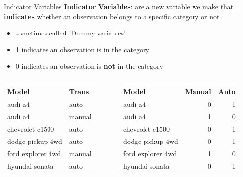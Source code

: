 \documentclass{beamer}
\begin{document}
\begin{frame}{Indicator Variables}
\textbf{Indicator Variables}: are a new variable we make that \textbf{indicates} whether an observation belongs to a specific category or not
\begin{itemize}
    \item sometimes called 'Dummy variables'
    \item 1 indicates an observation is in the category
    \item 0 indicates an observation is \textbf{not} in the category
\end{itemize}
\small
\begin{columns}
\begin{column}{0.45\textwidth}
\vspace{3mm}
\begin{table}[ht]
\centering
\begin{tabular}{ll}
  \hline
Model & Trans \\ 
  \hline
audi a4 & auto \\ 
  audi a4 & manual \\ 
  chevrolet c1500 & auto \\ 
  dodge pickup 4wd & auto \\ 
  ford explorer 4wd & manual \\ 
  hyundai sonata & auto \\ 
   \hline
\end{tabular}
\end{table}
\end{column}
\begin{column}{0.45\textwidth}  %
\begin{table}[ht]
\centering
\begin{tabular}{lrr}
  \hline
Model & Manual & Auto \\ 
  \hline
audi a4 & 0 & 1 \\ 
  audi a4 & 1 & 0 \\ 
  chevrolet c1500  & 0 & 1 \\ 
  dodge pickup 4wd & 0 & 1 \\ 
  ford explorer 4wd & 1 & 0 \\ 
  hyundai sonata & 0 & 1 \\ 
   \hline
\end{tabular}
\end{table}
\end{column}
\end{columns}
\end{frame}
\end{document}
